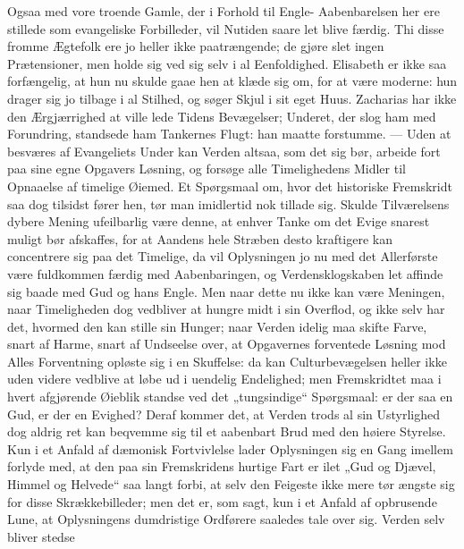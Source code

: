 \documentclass[12pt,a4paper]{book}
\begin{document}
Ogsaa med vore troende Gamle, der i Forhold til Engle-%
Aabenbarelsen her ere stillede som evangeliske Forbilleder, vil Nutiden
saare let blive færdig. Thi disse fromme Ægtefolk ere jo heller ikke
paatrængende; de gjøre slet ingen Prætensioner, men holde sig ved sig
selv i al Eenfoldighed. Elisabeth er ikke saa forfængelig, at hun nu
skulde gaae hen at klæde sig om, for at være moderne: hun drager sig jo
tilbage i al Stilhed, og søger Skjul i sit eget Huus. Zacharias har
ikke den Ærgjærrighed at ville lede Tidens Bevægelser; Underet, der
slog ham med Forundring, standsede ham Tankernes Flugt: han maatte
forstumme. --- Uden at besværes af Evangeliets Under kan Verden altsaa,
som det sig bør, arbeide fort paa sine egne Opgavers Løsning, og
forsøge alle Timelighedens Midler til Opnaaelse af timelige Øiemed. Et
Spørgsmaal om, hvor det historiske Fremskridt saa dog tilsidst fører
hen, tør man imidlertid nok tillade sig. Skulde Tilværelsens dybere
Mening ufeilbarlig være denne, at enhver Tanke om det Evige snarest
muligt bør afskaffes, for at Aandens hele Stræben desto kraftigere kan
concentrere sig paa det Timelige, da vil Oplysningen jo nu med det
Allerførste være fuldkommen færdig med Aabenbaringen, og
Verdensklogskaben let affinde sig baade med Gud og hans Engle. Men naar
dette nu ikke kan være Meningen, naar Timeligheden dog vedbliver at
hungre midt i sin Overflod, og ikke selv har det, hvormed den kan
stille sin Hunger; naar Verden idelig maa skifte Farve, snart af Harme,
snart af Undseelse over, at Opgavernes forventede Løsning mod Alles
Forventning opløste sig i en Skuffelse: da kan Culturbevægelsen heller
ikke uden videre vedblive at løbe ud i uendelig Endelighed; men
Fremskridtet maa i hvert afgjørende Øieblik standse ved det
„tungsindige“ Spørgsmaal: er der saa en Gud, er der en Evighed? Deraf
kommer det, at Verden trods al sin Ustyrlighed dog aldrig ret kan
beqvemme sig til et aabenbart Brud med den høiere Styrelse. Kun
i et Anfald af dæmonisk Fortvivlelse lader Oplysningen sig en Gang
imellem forlyde med, at den paa sin Fremskridens hurtige Fart er ilet
„Gud og Djævel, Himmel og Helvede“ saa langt forbi, at selv den
Feigeste ikke mere tør ængste sig for disse Skrækkebilleder; men det
er, som sagt, kun i et Anfald af opbrusende Lune, at Oplysningens
dumdristige Ordførere saaledes tale over sig. Verden selv bliver stedse
\end{document}
